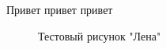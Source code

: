 \documentclass[12pt,a4paper]{article}
\begin{document}
Привет привет привет

\begin{figure}[h]
\caption{Тестовый рисунок "Лена"}
\label{fig:image}
\end{figure}
\end{document}
